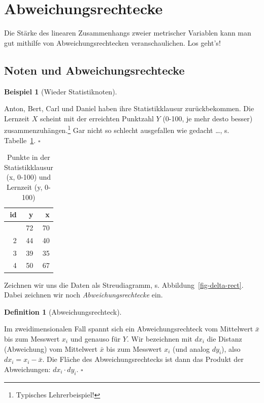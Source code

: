 \documentclass[
  letterpaper,
  twoside,
  open=any]{scrbook}
\theoremstyle{definition}
\newtheorem{definition}{Definition}[chapter]
\theoremstyle{definition}
\theoremstyle{definition}
\newtheorem{example}{Beispiel}[chapter]
\theoremstyle{remark}
\begin{document}
\section{Abweichungsrechtecke}\label{sec-cov}

Die Stärke des linearen Zusammenhangs zweier metrischer Variablen kann
man gut mithilfe von Abweichungsrechtecken veranschaulichen. Los geht's!

\subsection{Noten und
Abweichungsrechtecke}\label{noten-und-abweichungsrechtecke}

\begin{example}[Wieder
Statistiknoten]\protect\hypertarget{exm-noten2}{}\label{exm-noten2}

Anton, Bert, Carl und Daniel haben ihre Statistikklausur zurückbekommen.
Die Lernzeit \(X\) scheint mit der erreichten Punktzahl \(Y\) (0-100, je
mehr desto besser) zusammenzuhängen.\footnote{ Typisches Lehrerbeispiel!}
Gar nicht so schlecht ausgefallen wie gedacht \ldots, s.
Tabelle~\ref{tbl-noten2}. \(\square\)

\end{example}

\begin{longtable}[]{@{}rrr@{}}

\caption{\label{tbl-noten2}Punkte in der Statistikklausur (x, 0-100) und
Lernzeit (y, 0-100)}

\tabularnewline

\toprule\noalign{}
id & y & x \\
\midrule\noalign{}
\endhead
\bottomrule\noalign{}
\endlastfoot
1 & 72 & 70 \\
2 & 44 & 40 \\
3 & 39 & 35 \\
4 & 50 & 67 \\

\end{longtable}

Zeichnen wir uns die Daten als Streudiagramm, s.
Abbildung~\ref{fig-delta-rect}. Dabei zeichnen wir noch
\emph{Abweichungsrechtecke} ein.

\begin{definition}[Abweichungsrechteck]\protect\hypertarget{def-abweichungsrechteck}{}\label{def-abweichungsrechteck}

Im zweidimensionalen Fall spannt sich ein Abweichungsrechteck vom
Mittelwert \(\bar{x}\) bis zum Messwert \(x_i\) und genauso für \(Y\).
Wir bezeichnen mit \(dx_i\) die Distanz (Abweichung) vom Mittelwert
\(\bar{x}\) bis zum Messwert \(x_i\) (und analog \(dy_i\)), also
\(dx_i = x_i - \bar{x}\). Die Fläche des Abweichungsrechtecks ist dann
das Produkt der Abweichungen: \(dx_i \cdot dy_i\). \(\square\)

\end{definition}
\end{document}
